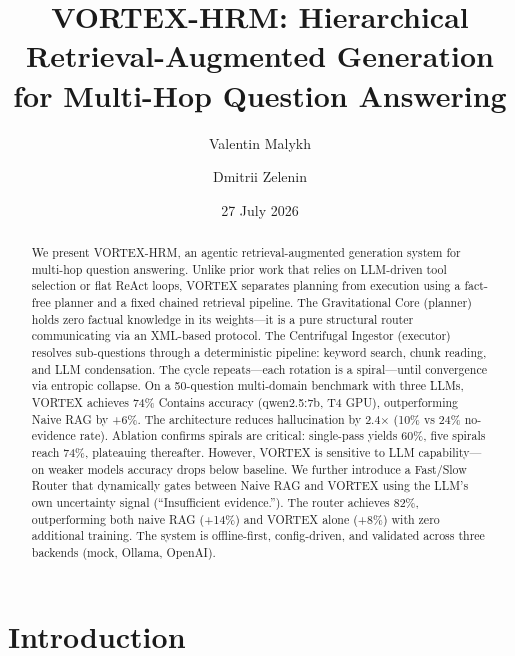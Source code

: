 \documentclass{zapiski}
\date{27 July 2026}
\begin{document}
\title[VORTEX-HRM]{VORTEX-HRM: Hierarchical Retrieval-Augmented Generation for Multi-Hop Question Answering}

\author[V.~Malykh]{Valentin Malykh}
\address[V.~Malykh]{Skolkovo Institute of Science and Technology, Moscow, Russia}

\author[D. Zelenin]{Dmitrii Zelenin}
\address[D. Zelenin]{GitHub: \url{github.com/dizel0110/Text-HRM-RAG}}
\email{}

\begin{abstract}
We present VORTEX-HRM, an agentic retrieval-augmented generation system for multi-hop question answering. Unlike prior work that relies on LLM-driven tool selection or flat ReAct loops, VORTEX separates planning from execution using a fact-free planner and a fixed chained retrieval pipeline. The Gravitational Core (planner) holds zero factual knowledge in its weights---it is a pure structural router communicating via an XML-based protocol. The Centrifugal Ingestor (executor) resolves sub-questions through a deterministic pipeline: keyword search, chunk reading, and LLM condensation. The cycle repeats---each rotation is a spiral---until convergence via entropic collapse. On a 50-question multi-domain benchmark with three LLMs, VORTEX achieves 74\% Contains accuracy (qwen2.5:7b, T4 GPU), outperforming Naive RAG by +6\%. The architecture reduces hallucination by 2.4$\times$ (10\% vs 24\% no-evidence rate). Ablation confirms spirals are critical: single-pass yields 60\%, five spirals reach 74\%, plateauing thereafter. However, VORTEX is sensitive to LLM capability---on weaker models accuracy drops below baseline. We further introduce a Fast/Slow Router that dynamically gates between Naive RAG and VORTEX using the LLM's own uncertainty signal (``Insufficient evidence.''). The router achieves 82\%, outperforming both naive RAG (+14\%) and VORTEX alone (+8\%) with zero additional training. The system is offline-first, config-driven, and validated across three backends (mock, Ollama, OpenAI).
\end{abstract}


\maketitle

\section{Introduction}
\label{sec:intro}
\end{document}
